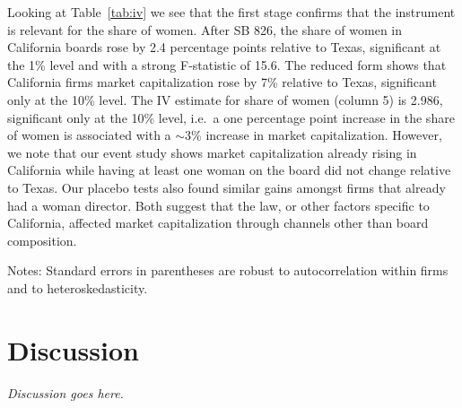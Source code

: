 \documentclass[12pt]{article}
\newcommand{\tablenotes}[1]{\par\vspace{4pt}\begin{minipage}{0.95\textwidth}\footnotesize #1\end{minipage}}
\begin{document}
Looking at Table~\ref{tab:iv} we see that the first stage confirms that the instrument is relevant for the share of women. After SB 826, the share of women in California boards rose by 2.4 percentage points relative to Texas, significant at the 1\% level and with a strong F-statistic of 15.6. The reduced form shows that California firms market capitalization rose by 7\% relative to Texas, significant only at the 10\% level. The IV estimate for share of women (column 5) is 2.986, significant only at the 10\% level, i.e.\ a one percentage point increase in the share of women is associated with a $\sim$3\% increase in market capitalization. However, we note that our event study shows market capitalization already rising in California while having at least one woman on the board did not change relative to Texas. Our placebo tests also found similar gains amongst firms that already had a woman director. Both suggest that the law, or other factors specific to California, affected market capitalization through channels other than board composition.

\begin{table}[H]
\centering
\caption{First stage (cols 1--2), reduced form (col 3), IV (cols 4--5), firm and year FE, 2011--2020}
\label{tab:iv}
\tablenotes{Notes: Standard errors in parentheses are robust to autocorrelation within firms and to heteroskedasticity.}
\end{table}

\section{Discussion}
\textit{Discussion goes here.}

\end{document}
